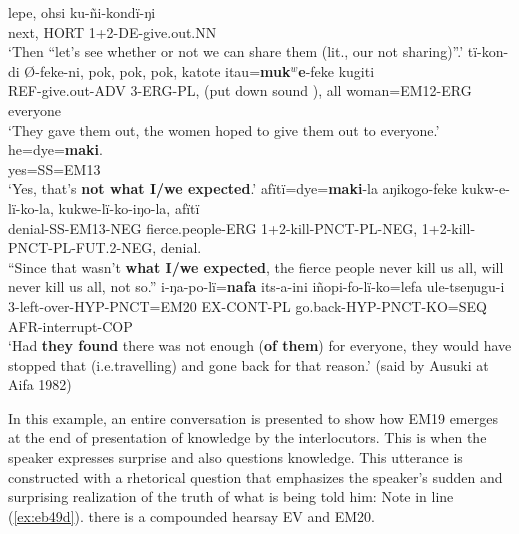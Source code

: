 \documentclass[output=paper]{langsci/langscibook}
\begin{document}
\begin{exe}
\ex \label{ex:eb48}
	\begin{xlist}
	\ex \label{ex:eb48a}
	\gll lepe, ohsi ku-ñi-kondï-ŋi\\
	next, HORT 1+2-DE-give.out.NN\\
	\trans ‘Then  “let’s see whether or not we can share them (lit., our not sharing)”.’
	\ex \label{ex:eb48b}
	\gll tï-kon-di Ø-feke-ni, pok, pok, pok, katote itau=\textbf{muk$^w$e}-feke kugiti\\
	REF-give.out-ADV 3-ERG-PL, (put down sound ), all woman=EM12-ERG everyone\\
	\trans ‘They gave them out, the women hoped to give them out to everyone.’
	\ex \label{ex:eb48c}
	\gll he=dye=\textbf{maki}.\\
	yes=SS=EM13\\
	\trans ‘Yes, that’s \textbf{not what I/we expected}.’
	\ex \label{ex:eb48d}
	\gll afïtï=dye=\textbf{maki}-la aŋikogo-feke kukw-e-lï-ko-la, kukwe-lï-ko-iŋo-la, afïtï\\
	denial-SS-EM13-NEG fierce.people-ERG 1+2-kill-PNCT-PL-NEG, 1+2-kill-PNCT-PL-FUT.2-NEG, denial.\\
	\trans “Since that wasn’t \textbf{what I/we expected}, the fierce people never  kill us all, will never  kill us all, not so.”
	\ex \label{ex:eb48e}
	\gll i-ŋa-po-lï=\textbf{nafa} its-a-ini iñopi-fo-lï-ko=lefa ule-tseŋugu-i\\
	3-left-over-HYP-PNCT=EM20 EX-CONT-PL go.back-HYP-PNCT-KO=SEQ AFR-interrupt-COP\\
	\trans ‘Had \textbf{they found} there was not enough (\textbf{of them}) for everyone,  they would have stopped that (i.e.travelling) and gone back for that reason.’ (said by Ausuki at Aifa 1982)
\end{xlist}
\end{exe}

In this example, an entire conversation is presented to show how EM19 emerges at the end of presentation of knowledge by the interlocutors.  This is when the speaker expresses surprise and also questions knowledge. This utterance is constructed with a rhetorical question that emphasizes the speaker’s sudden and surprising realization of the truth of what is being told him: Note in line (\ref{ex:eb49d}). there is a compounded hearsay EV and EM20. 
\end{document}
